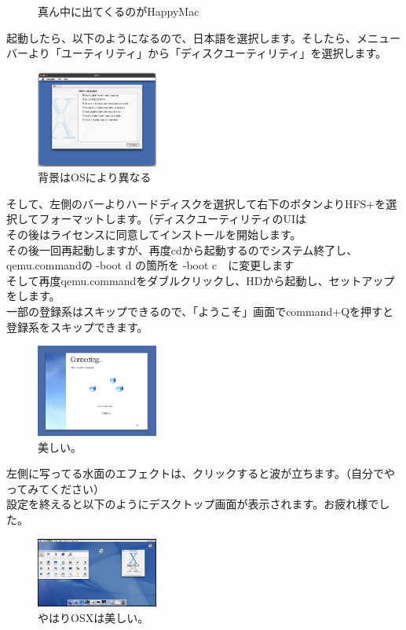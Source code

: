 \documentclass[b5paper,9pt,platex,dvipdfmx]{jsarticle}
\begin{document}
\begin{multicols*}{3}
\begin{figure}[H]
  \caption{真ん中に出てくるのがHappyMac}
\end{figure}
起動したら、以下のようになるので、日本語を選択します。そしたら、メニューバーより「ユーティリティ」から「ディスクユーティリティ」を選択します。\\
\begin{figure}[H]
  \centering
  \includegraphics[width=4cm]{osx-cd.png}
  \caption{背景はOSにより異なる}
\end{figure}
そして、左側のバーよりハードディスクを選択して右下のボタンよりHFS+を選択してフォーマットします。（ディスクユーティリティのUIは\\
その後はライセンスに同意してインストールを開始します。\\
その後一回再起動しますが、再度cdから起動するのでシステム終了し、qemu.commandの -boot d の箇所を -boot c　に変更します\\
そして再度qemu.commandをダブルクリックし、HDから起動し、セットアップをします。\\
一部の登録系はスキップできるので、「ようこそ」画面でcommand+Qを押すと登録系をスキップできます。\\
\begin{figure}[H]
  \centering
  \includegraphics[width=4cm]{osx-connect.png}
  \caption{美しい。}
\end{figure}
左側に写ってる水面のエフェクトは、クリックすると波が立ちます。（自分でやってみてください）\\
設定を終えると以下のようにデスクトップ画面が表示されます。お疲れ様でした。\\
\begin{figure}[H]
  \centering
  \includegraphics[width=4cm]{osxdesktop.png}
  \caption{やはりOSXは美しい。}
\end{figure}

\end{multicols*}
\end{document}
